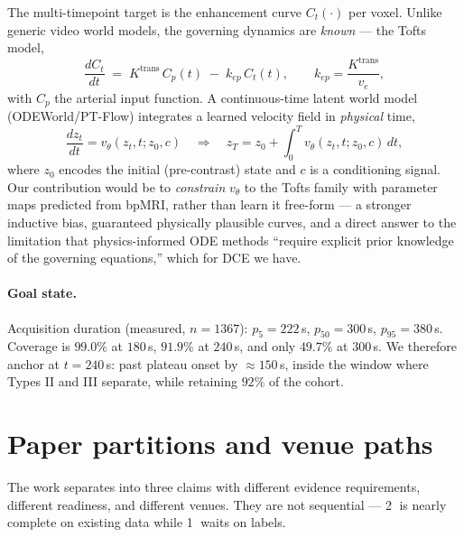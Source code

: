\documentclass[11pt]{article}
\newcommand{\1}{\mathbb{1}}
\begin{document}
The multi-timepoint target is the enhancement curve $C_t(\cdot)$ per voxel. Unlike generic
video world models, the governing dynamics are \emph{known} --- the Tofts model,
\begin{equation}
\frac{dC_t}{dt} \;=\; K^{\text{trans}}\,C_p(t)\;-\;k_{ep}\,C_t(t),
\qquad k_{ep}=\frac{K^{\text{trans}}}{v_e},
\end{equation}
with $C_p$ the arterial input function. A continuous-time latent world model
(ODEWorld/PT-Flow) integrates a learned velocity field in \emph{physical} time,
\begin{equation}
\frac{dz_t}{dt}=v_\theta(z_t,t;z_0,c)
\quad\Longrightarrow\quad
z_T=z_0+\int_0^T v_\theta(z_t,t;z_0,c)\,dt ,
\end{equation}
where $z_0$ encodes the initial (pre-contrast) state and $c$ is a conditioning signal.
Our contribution would be to \emph{constrain} $v_\theta$ to the Tofts family with parameter
maps predicted from bpMRI, rather than learn it free-form --- a stronger inductive bias,
guaranteed physically plausible curves, and a direct answer to the limitation that
physics-informed ODE methods ``require explicit prior knowledge of the governing equations,''
which for DCE we have.

\paragraph{Goal state.} Acquisition duration (measured, $n=1367$): $p_5=222$\,s,
$p_{50}=300$\,s, $p_{95}=380$\,s. Coverage is $99.0\%$ at $180$\,s, $\mathbf{91.9\%}$ at
$240$\,s, and only $49.7\%$ at $300$\,s. We therefore anchor at $t=240$\,s: past plateau
onset by $\approx150$\,s, inside the window where Types II and III separate, while retaining
$92\%$ of the cohort.

\section{Paper partitions and venue paths}

The work separates into three claims with different evidence requirements, different
readiness, and different venues. They are not sequential --- \textcircled{2} is nearly
complete on existing data while \textcircled{1} waits on labels.
\end{document}
